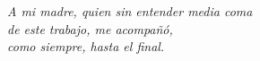 
\begin{dedication}

\vspace*{1cm}

\bigskip
\bigskip

\slshape{\vspace{0.5cm}
	A mi madre, quien sin entender media coma \\ de este trabajo, me acompañó,\\ como siempre, hasta el final.
}

\end{dedication}
